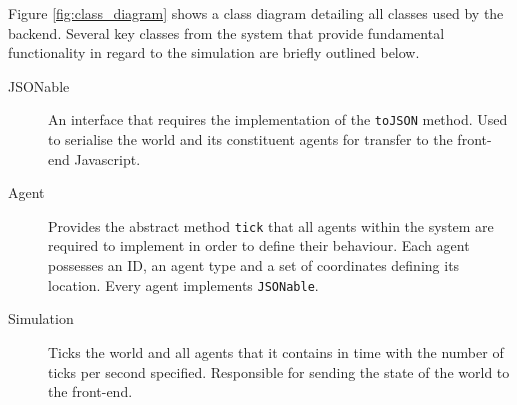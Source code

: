 Figure \ref{fig:class_diagram} shows a class diagram detailing all classes used by the backend. Several key classes from the system that provide fundamental functionality in regard to the simulation are briefly outlined below. 

\begin{description}
	\item[JSONable] An interface that requires the implementation of the \texttt{toJSON} method. Used to serialise the world and its constituent agents for transfer to the front-end Javascript.
	\item[Agent] Provides the abstract method \lstinline{tick} that all agents within the system are required to implement in order to define their behaviour. Each agent possesses an ID, an agent type and a set of coordinates defining its location. Every agent implements \lstinline{JSONable}.
	\item[Simulation] Ticks the world and all agents that it contains in time with the number of ticks per second specified. Responsible for sending the state of the world to the front-end.
\end{description}

